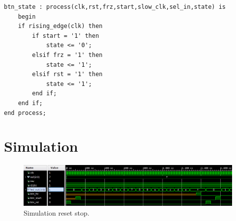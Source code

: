 \documentclass[11pt, a4paper]{article}
\begin{document}
\begin{lstlisting}[style=vhdl,label={lst:btn_state},caption={\texttt{btn\_state} process.}]
btn_state : process(clk,rst,frz,start,slow_clk,sel_in,state) is
    begin
    if rising_edge(clk) then
        if start = '1' then
            state <= '0';
        elsif frz = '1' then
            state <= '1';
        elsif rst = '1' then
            state <= '1';
        end if;
    end if;
end process;\end{lstlisting}

\section{Simulation}

\begin{figure}[H]
\centering
\includegraphics[width=1\textwidth]{../main/image/sim_2.png}
\caption{\label{fig:sim_1} Simulation reset stop.}
\end{figure}
\end{document}
